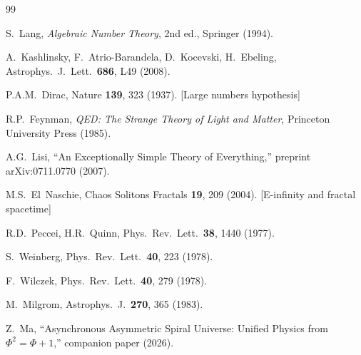 \documentclass[12pt,a4paper]{article}
\begin{document}
\begin{thebibliography}{99}

 S.~Lang, \textit{Algebraic Number Theory}, 2nd ed., Springer (1994).


 A.~Kashlinsky, F.~Atrio-Barandela, D.~Kocevski, H.~Ebeling, Astrophys.\ J.\ Lett.\ \textbf{686}, L49 (2008).


 P.A.M.~Dirac, Nature \textbf{139}, 323 (1937). [Large numbers hypothesis]

 R.P.~Feynman, \textit{QED: The Strange Theory of Light and Matter}, Princeton University Press (1985).


 A.G.~Lisi, ``An Exceptionally Simple Theory of Everything,'' preprint arXiv:0711.0770 (2007).

 M.S.~El~Naschie, Chaos Solitons Fractals \textbf{19}, 209 (2004). [E-infinity and fractal spacetime]


 R.D.~Peccei, H.R.~Quinn, Phys.\ Rev.\ Lett.\ \textbf{38}, 1440 (1977).

 S.~Weinberg, Phys.\ Rev.\ Lett.\ \textbf{40}, 223 (1978).

 F.~Wilczek, Phys.\ Rev.\ Lett.\ \textbf{40}, 279 (1978).

 M.~Milgrom, Astrophys.\ J.\ \textbf{270}, 365 (1983).


 Z.~Ma, ``Asynchronous Asymmetric Spiral Universe: Unified Physics from $\Phi^2=\Phi+1$,'' companion paper (2026).

\end{thebibliography}
\end{document}
